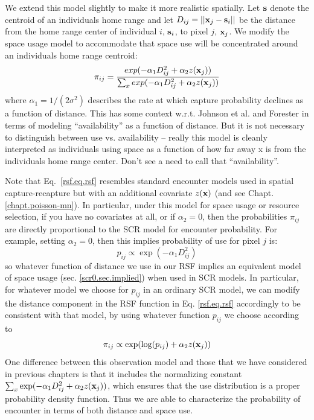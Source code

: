 We extend this model slightly to make it more realistic spatially. Let
${\bf s}$ denote the centroid of an individuals home range and let
$D_{ij} = ||{\bf x}_{j} - {\bf s}_{i}||$ be the distance from the home
range center of individual $i$, ${\bf s}_{i}$, to pixel $j$, ${\bf
  x}_{j}$. We modify the space usage model to accommodate that space
use will be concentrated around an individuals home range centroid:
\begin{equation}
 \pi_{ij} = \frac{ exp( -\alpha_{1} D_{ij}^{2} +\alpha_{2} z({\bf x}_{j}) ) }
{ \sum_{x} exp(-\alpha_{1} D_{ij}^{2} +\alpha_{2} z({\bf x}_{j}))}
\label{rsf.eq.rsf}
\end{equation}
where $\alpha_1=1/(2\sigma^2)$ describes the rate at which capture
probability declines as a function of distance. This has some context
w.r.t. Johnson et al. and Forester in terms of modeling
``availability'' as a function of distance. But it is not necessary to
distinguish between use vs. availability -- really this model is
cleanly interpreted as individuals using space as a function of how
far away x is from the individuals home range center. Don't see a
need to call that ``availability''.

Note that
Eq.~\ref{rsf.eq.rsf} resembles standard encounter models used in
spatial capture-recapture but with an additional covariate $z({\bf
  x})$ (and see Chapt. \ref{chapt.poisson-mn}).  In particular, under
this model for space usage or resource selection, if you have no
covariates at all, or if $\alpha_{2} = 0$, then the probabilities
$\pi_{ij}$ are directly proportional to the SCR model for encounter
probability.  For example, setting $\alpha_{2} = 0$, then this implies
probability of use for pixel $j$ is:
\[
p_{ij} \propto  \exp( -\alpha_{1} D_{ij}^{2})
\]
so whatever function of distance we use in our RSF implies an
equivalent model of space usage (sec. \ref{scr0.sec.implied}) when
used in SCR models. In particular, for whatever model we choose for
$p_{ij}$ in an ordinary SCR model, we can modify the distance
component in the RSF function in Eq. \ref{rsf.eq.rsf} accordingly to
be consistent with that model, by using whatever function $p_{ij}$ we
choose according to
\[
\pi_{ij} \propto \exp( \log(p_{ij}) + \alpha_{2} z({\bf x}_{j}) )
\]
One difference between this observation model and those that we have
considered in previous chapters is that it includes the normalizing
constant $\sum_{x} \exp(-\alpha_{1} D_{ij}^{2} +\alpha_{2} z({\bf
  x}_{j}))$, which ensures that the use distribution is a proper
probability density function. Thus we are able to characterize the
probability of encounter in terms of both distance and space use.

